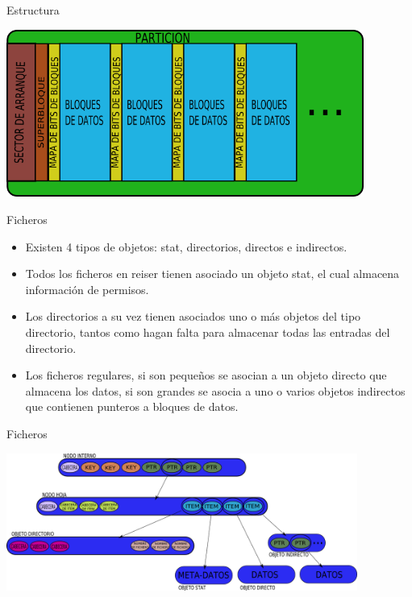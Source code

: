 \begin{frame}{Estructura}
  \begin{center}
    \includegraphics[height=5.5cm]{imgs/reiserfs_struct.png}
  \end{center}
\end{frame}

\begin{frame}{Ficheros}
  \begin{itemize}
    \item Existen 4 tipos de objetos: stat, directorios, directos e indirectos.
    \item Todos los ficheros en reiser tienen asociado un objeto stat, el cual almacena información de permisos.
    \item Los directorios a su vez tienen asociados uno o más objetos del tipo directorio, tantos como hagan falta para almacenar todas las entradas del directorio.
    \item Los ficheros regulares, si son pequeños se asocian a un objeto directo que almacena los datos, si son grandes se asocia a uno o varios objetos indirectos que contienen punteros a bloques de datos.
  \end{itemize}
\end{frame}

\begin{frame}{Ficheros}
  \begin{center}
    \includegraphics[height=4.5cm]{imgs/reiserfs_files.png}
  \end{center}
\end{frame}
